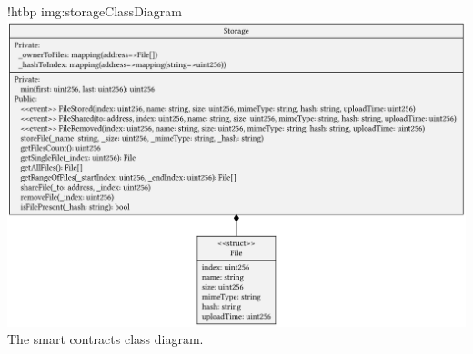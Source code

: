 \namedfigure
{!htbp}
{img:storageClassDiagram}
{\includegraphics[width=\textwidth]{resources/images/storage-class-diagram.pdf}}
{The smart contracts class diagram.}
